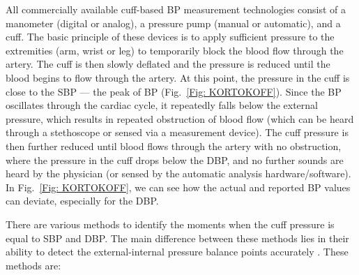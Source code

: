 \documentclass[journal,article,moreauthors]{Definitions/mdpi}
\begin{document}
All commercially available cuff-based BP measurement technologies consist of a manometer (digital or analog), a pressure pump (manual or automatic), and a cuff. The basic principle of these devices is to apply sufficient pressure to the extremities (arm, wrist or leg) to temporarily block the blood flow through the artery. The cuff is then slowly deflated and the pressure is reduced until the blood begins to flow through the artery. At this point, the pressure in the cuff is close to the SBP --- the peak of BP  (Fig.~\ref{Fig: KORTOKOFF}). Since the BP oscillates through the cardiac cycle, it repeatedly falls below the external pressure, which results in repeated obstruction of blood flow (which can be heard through a stethoscope or sensed via a measurement device). The cuff pressure is then further reduced until blood flows through the artery with no obstruction, where the pressure in the cuff drops below the DBP, and no further sounds are heard by the physician (or sensed by the automatic analysis hardware/software). In Fig.~\ref{Fig: KORTOKOFF}, we can see how the actual and reported BP values can deviate, especially for the DBP.


There are various methods to identify the moments when the cuff pressure is equal to SBP and DBP. The main difference between these methods lies in their ability to detect the external-internal pressure balance points accurately \citep{mousavi2018designing}. These methods are:
\end{document}

